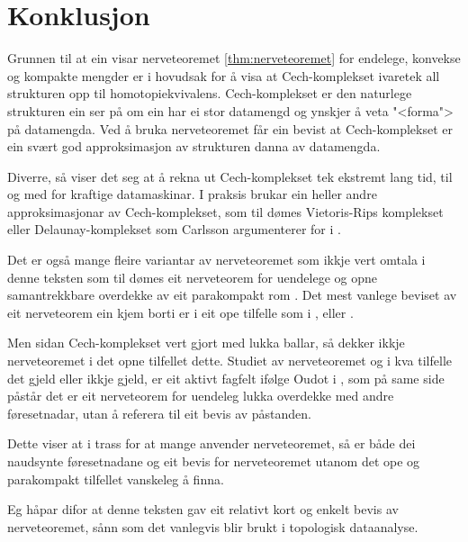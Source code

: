 \documentclass[a4paper, 12pt, norsk]{article}
\theoremstyle{plain}
\theoremstyle{definition}
\begin{document}
\section{Konklusjon}

Grunnen til at ein visar nerveteoremet \autoref{thm:nerveteoremet} for endelege, konvekse og kompakte mengder er i hovudsak for å visa at Cech-komplekset ivaretek all strukturen opp til homotopiekvivalens. Cech-komplekset er den naturlege strukturen ein ser på om ein har ei stor datamengd og ynskjer å veta "<forma"> på datamengda. Ved å bruka nerveteoremet får ein bevist at Cech-komplekset er ein svært god approksimasjon av strukturen danna av datamengda.

Diverre, så viser det seg at å rekna ut Cech-komplekset tek ekstremt lang tid, til og med for kraftige datamaskinar. I praksis brukar ein heller andre approksimasjonar av Cech-komplekset, som til dømes Vietoris-Rips komplekset eller Delaunay-komplekset som Carlsson argumenterer for i \cite[s. 263--264]{MR2476414}.

Det er også mange fleire variantar av nerveteoremet som ikkje vert omtala i denne teksten som til dømes eit nerveteorem for uendelege og opne samantrekkbare overdekke av eit parakompakt rom \cite[Corollary 4G.3]{MR1867354}. Det mest vanlege beviset av eit nerveteorem ein kjem borti er i eit ope tilfelle som i \cite[Theorem 15.21]{MR2361455}, \cite[Theorem 4.3]{MR4218370} eller \cite[Theorem 2.3]{MR2476414}.

Men sidan Cech-komplekset vert gjort med lukka ballar, så dekker ikkje nerveteoremet i det opne tilfellet dette. Studiet av nerveteoremet og i kva tilfelle det gjeld eller ikkje gjeld, er eit aktivt fagfelt ifølge Oudot i \cite[s. 82]{MR3408277}, som på same side påstår det er eit nerveteorem for uendeleg lukka overdekke med andre føresetnadar, utan å referera til eit bevis av påstanden.

Dette viser at i trass for at mange anvender nerveteoremet, så er både dei naudsynte føresetnadane og eit bevis for nerveteoremet utanom det ope og parakompakt tilfellet vanskeleg å finna.

Eg håpar difor at denne teksten gav eit relativt kort og enkelt bevis av nerveteoremet, sånn som det vanlegvis blir brukt i topologisk dataanalyse.

{}

\end{document}
